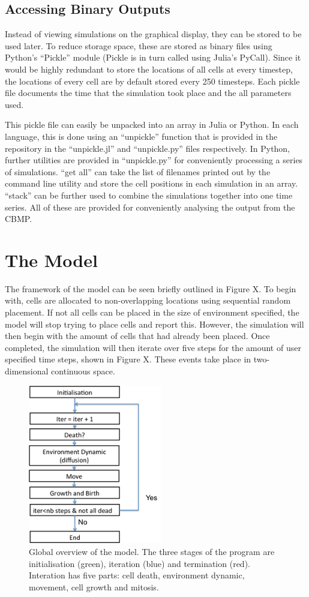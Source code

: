 \documentclass[12pt]{article}
\begin{document}
\subsection{Accessing Binary Outputs}
Instead of viewing simulations on the graphical display, they can be 
stored to be used later. To reduce storage space, these are stored as 
binary files using Python's ``Pickle'' module (Pickle is in turn called 
using Julia's PyCall). Since it would be highly redundant to store the 
locations of all cells at every timestep, the locations of every cell 
are by default stored every 250 timesteps. Each pickle file documents 
the time that the simulation took place and the all parameters used.

This pickle file can easily be unpacked into an array in Julia or 
Python. In each language, this is done using an ``unpickle'' function 
that is provided in the repository in the ``unpickle.jl'' and 
``unpickle.py'' files respectively. In Python, further utilities are 
provided in ``unpickle.py'' for conveniently processing a series of 
simulations. ``get all'' can take the list of filenames printed out by 
the command line utility and store the cell positions in each simulation 
in an array. ``stack'' can be further used to combine the simulations 
together into one time series. All of these are provided for 
conveniently analysing the output from the CBMP.

\section{The Model}
The framework of the model can be seen briefly outlined in Figure X. To 
begin with, cells are allocated to non-overlapping locations using 
sequential random placement. If not all cells can be placed in the size 
of environment specified, the model will stop trying to place cells and 
report this. However, the simulation will then begin with the amount of 
cells that had already been placed. Once completed, the simulation will 
then iterate over five steps for the amount of user specified time 
steps, shown in Figure X. These events take place in two-dimensional 
continuous space. 

\begin{figure}[H]
\centering
\includegraphics[width=5.81cm]{media/algorithmoverview.png}
\caption[]{Global overview of the model. The three stages of the program
  are initialisation (green), iteration (blue) and termination (red). 
  Interation has five parts: cell death, environment dynamic, movement, cell 
growth and mitosis.}
\end{figure}
\end{document}
